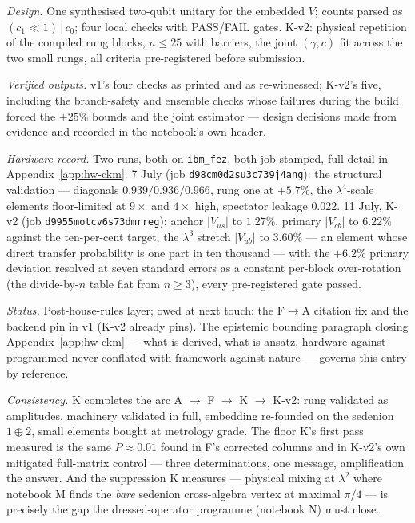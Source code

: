 \emph{Design.} One synthesised two-qubit unitary for the embedded $V$; counts parsed as
$(c_{1}{\ll}1)\,|\,c_{0}$; four local checks with PASS/FAIL gates. K-v2: physical repetition of
the compiled rung blocks, $n \le 25$ with barriers, the joint $(\gamma, c)$ fit across the two
small rungs, all criteria pre-registered before submission.

\emph{Verified outputs.} v1's four checks as printed and as re-witnessed; K-v2's five, including
the branch-safety and ensemble checks whose failures during the build forced the $\pm25\%$ bounds
and the joint estimator --- design decisions made from evidence and recorded in the notebook's
own header.

\emph{Hardware record.} Two runs, both on \texttt{ibm\_fez}, both job-stamped, full detail in
Appendix~\ref{app:hw-ckm}. 7 July (job \texttt{d98cm0d2su3c739j4ang}): the structural validation
--- diagonals $0.939/0.936/0.966$, rung one at $+5.7\%$, the $\lambda^{4}$-scale elements
floor-limited at $9\times$ and $4\times$ high, spectator leakage $0.022$. 11 July, K-v2 (job
\texttt{d9955motcv6s73dmrreg}): anchor $\lvert V_{us}\rvert$ to $1.27\%$, primary
$\lvert V_{cb}\rvert$ to $6.22\%$ against the ten-per-cent target, the $\lambda^{3}$ stretch
$\lvert V_{ub}\rvert$ to $3.60\%$ --- an element whose direct transfer probability is one part in
ten thousand --- with the $+6.2\%$ primary deviation resolved at seven standard errors as a
constant per-block over-rotation (the divide-by-$n$ table flat from $n \ge 3$), every
pre-registered gate passed.

\emph{Status.} Post-house-rules layer; owed at next touch: the F$\to$A citation fix and the
backend pin in v1 (K-v2 already pins). The epistemic bounding paragraph closing
Appendix~\ref{app:hw-ckm} --- what is derived, what is ansatz, hardware-against-programmed never
conflated with framework-against-nature --- governs this entry by reference.

\emph{Consistency.} K completes the arc A $\to$ F $\to$ K $\to$ K-v2: rung validated as
amplitudes, machinery validated in full, embedding re-founded on the sedenion $1 \oplus 2$, small
elements bought at metrology grade. The floor K's first pass measured is the same
$P \approx 0.01$ found in F's corrected columns and in K-v2's own mitigated full-matrix control
--- three determinations, one message, amplification the answer. And the suppression K measures
--- physical mixing at $\lambda^{2}$ where notebook M finds the \emph{bare} sedenion
cross-algebra vertex at maximal $\pi/4$ --- is precisely the gap the dressed-operator programme
(notebook N) must close.

